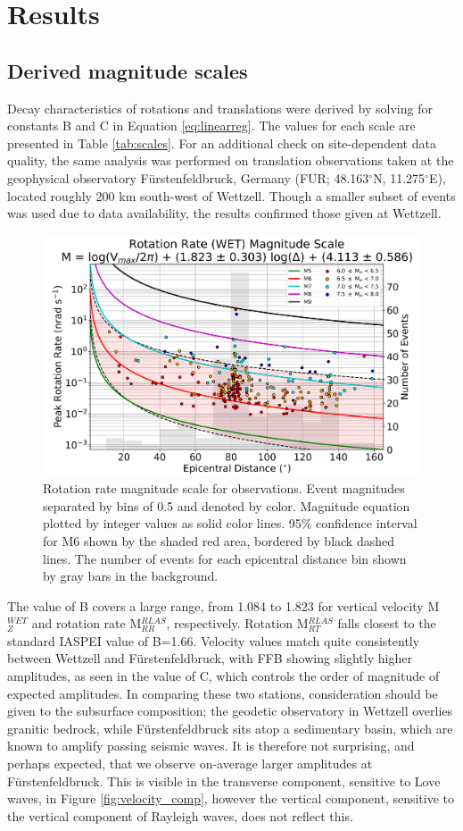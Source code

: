 \documentclass{gji}
\begin{document}
\section{Results}\label{sec:results}
\subsection{Derived magnitude scales}
Decay characteristics of rotations and translations were derived by solving for constants B and C in Equation \ref{eq:linearreg}. The values for each scale are presented in Table \ref{tab:scales}. For an additional check on site-dependent data quality, the same analysis was performed on translation observations taken at the geophysical observatory F\"urstenfeldbruck, Germany (FUR; 48.163$^\circ$N, 11.275$^\circ$E), located roughly 200 km south-west of Wettzell. Though a smaller subset of events was used due to data availability, the results confirmed those given at Wettzell. 


\begin{figure}
\centerline{\includegraphics[width=.8\textwidth]{RR_WET}}
\caption{Rotation rate magnitude scale for observations. Event magnitudes separated by bins of 0.5 and denoted by color. Magnitude equation plotted by integer values as solid color lines. 95\% confidence interval for M6 shown by the shaded red area, bordered by black dashed lines. The number of events for each epicentral distance bin shown by gray bars in the background.}
\label{fig:rr_obs}
\end{figure}

The value of B covers a large range, from 1.084 to 1.823 for vertical velocity M$^{WET}_{Z}$ and rotation rate M$^{RLAS}_{RR}$, respectively. Rotation M$^{RLAS}_{RT}$ falls closest to the standard IASPEI value of B=1.66. Velocity values match quite consistently between Wettzell and F\"urstenfeldbruck, with FFB showing slightly higher amplitudes, as seen in the value of C, which controls the order of magnitude of expected amplitudes. In comparing these two stations, consideration should be given to the subsurface composition; the geodetic observatory in Wettzell overlies granitic bedrock, while F\"urstenfeldbruck sits atop a sedimentary basin, which are known to amplify passing seismic waves. It is therefore not surprising, and perhaps expected, that we observe on-average larger amplitudes at F\"urstenfeldbruck. This is visible in the transverse component, sensitive to Love waves, in Figure \ref{fig:velocity_comp}, however the vertical component, sensitive to the vertical component of Rayleigh waves, does not reflect this. 
\end{document}
